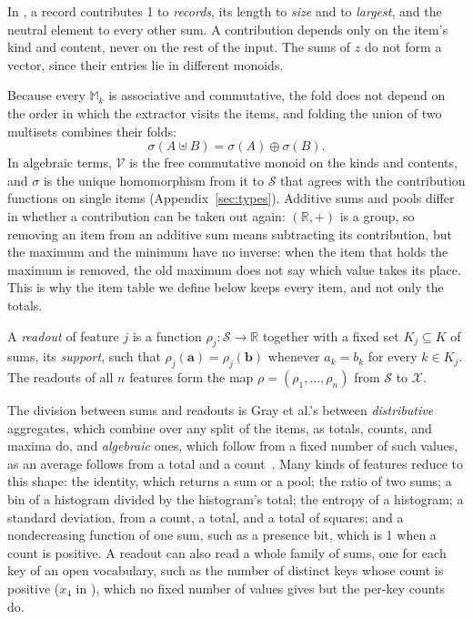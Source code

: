 \noindent In , a record contributes 1 to \textit{records}, its length to \textit{size} and
to \textit{largest}, and the neutral element to every other sum. A contribution depends only on the item's kind and
content, never on the rest of the input. The sums of $z$ do not form a vector, since their entries lie in different
monoids.

Because every $\mathbb{M}_k$ is associative and commutative, the fold does not depend on the order in which the
extractor visits the items, and folding the union of two multisets combines their folds:
\begin{equation}
  \label{eq:fw:homomorphism}
  \sigma(A \uplus B) = \sigma(A) \oplus \sigma(B).
\end{equation}
In algebraic terms, $\mathcal{V}$ is the free commutative monoid on the kinds and contents, and $\sigma$ is the unique
homomorphism from it to $\mathcal{S}$ that agrees with the contribution functions on single items
(Appendix~\ref{sec:types}). Additive sums and pools differ in whether a contribution can be taken out again:
$(\mathbb{R}, +)$ is a group, so removing an item from an additive sum means subtracting its contribution, but the
maximum and the minimum have no inverse: when the item that holds the maximum is removed, the old maximum does not
say which value takes its place. This is why the item table we define below keeps every item, and not only the
totals.

\label{def:fw:readout}
{
A \emph{readout} of feature $j$ is a function $\rho_j: \mathcal{S} \to \mathbb{R}$ together with a fixed set
$K_j \subseteq K$ of sums, its \emph{support}, such that $\rho_j(\mathbf{a}) = \rho_j(\mathbf{b})$ whenever
$a_k = b_k$ for every $k \in K_j$. The readouts of all $n$ features form the map $\rho = (\rho_1, \dots, \rho_n)$
from $\mathcal{S}$ to $\mathcal{X}$.
}

\noindent The division between sums and readouts is Gray et al.'s between \emph{distributive} aggregates, which combine over any split of the items, as
totals, counts, and maxima do, and \emph{algebraic} ones, which follow from a fixed number of such values, as an
average follows from a total and a count~\cite{gray1997data}. Many kinds of features reduce to this shape: the identity, which returns a sum or a pool; the ratio of two sums; a bin of a histogram divided by the
histogram's total; the entropy of a histogram; a standard deviation, from a count, a total, and a total of squares;
and a nondecreasing function of one sum, such as a presence bit, which is 1 when a count is positive. A readout can also read a whole family of sums, one for each
key of an open vocabulary, such as the number of distinct keys whose count is positive ($x_4$ in
), which no fixed number of values gives but the per-key counts do.

